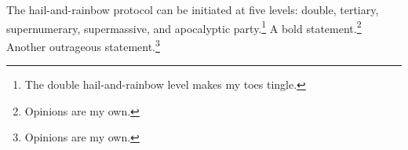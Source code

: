 
The hail-and-rainbow protocol can be initiated at five levels: double, tertiary, supernumerary,
supermassive, and apocalyptic party.\footnote{The double hail-and-rainbow level makes my toes tingle.}
A bold statement.\footnote{Opinions are my own.}
Another outrageous statement.\footnote{Opinions are my own.}
